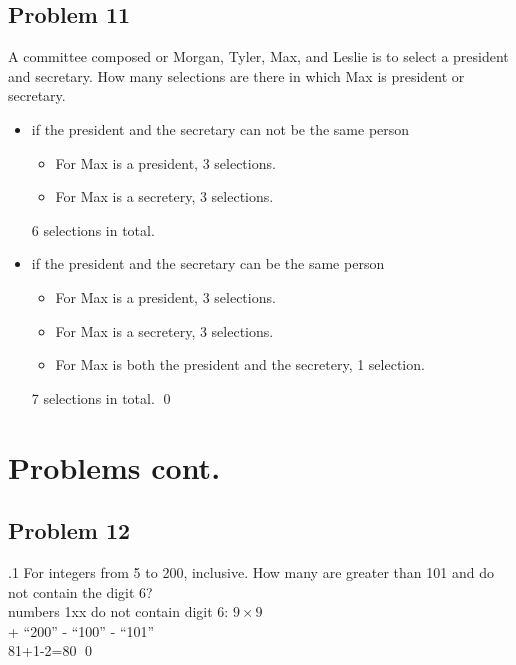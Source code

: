 \documentclass[
               handout,
               ]{beamer}
\begin{document}
    \subsection{Problem 11}
    
        \begin{frame}[c]{\subsecname}
            A committee composed or Morgan, Tyler, Max, and Leslie is to select a president
and secretary. How many selections are there in which Max is president or secretary.\\\pause
		 \begin{itemize}
		     \item
if the president and the secretary can not be the same person
                \begin{itemize}
                    \item For Max is a president, 3 selections.
                    \item For Max is a secretery, 3 selections.
                \end{itemize}
                6 selections in total.
                \item
if the president and the secretary can be the same person
                \begin{itemize}
                    \item For Max is a president, 3 selections.
                    \item For Max is a secretery, 3 selections.
                    \item For Max is both the president and the secretery, 1 selection.
                \end{itemize}
                7 selections in total. \qed
		\end{itemize}
        \end{frame}



\section{Problems cont.}

    \subsection{Problem 12}
    
        \begin{frame}[c]{\subsecname.1}
            For integers from 5 to 200, inclusive. How many are greater than 101 and do not contain the digit 6?\\$\;$\\\pause
            numbers 1xx do not contain digit 6: $9\times9$\\
            + ``200'' - ``100'' - ``101''\\
            81+1-2=80 \qed
        \end{frame}
    
\end{document}
